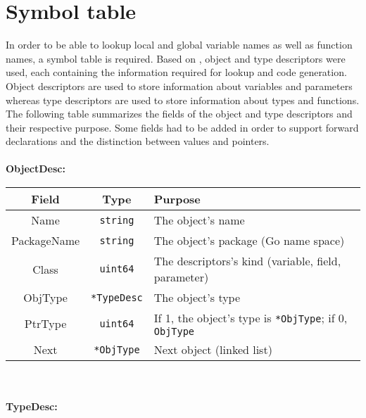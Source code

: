 \documentclass[a4paper]{scrreprt}
\begin{document}
  \chapter{Symbol table}
    In order to be able to lookup local and global variable names as well as function names, a symbol table is required. Based on \cite{wir96}, object and type descriptors were used, each containing the information required for lookup and code generation. Object descriptors are used to store information about variables and parameters whereas type descriptors are used to store information about types and functions.\\
    The following table summarizes the fields of the object and type descriptors and their respective purpose. Some fields had to be added in order to support forward declarations and the distinction between values and pointers.\\ \\
      \textbf{ObjectDesc:}\\
      \begin{tabular}{|c|c|l|}
        \hline
        \textbf{Field} & \textbf{Type} & \textbf{Purpose}\\ \hline
        Name & \texttt{string} & The object's name\\ \hline
        PackageName & \texttt{string} & The object's package (Go name space)\\ \hline
        Class & \texttt{uint64} & The descriptors's kind (variable, field, parameter)\\ \hline
        ObjType & \texttt{*TypeDesc} & The object's type\\ \hline
        PtrType & \texttt{uint64} & If 1, the object's type is \texttt{*ObjType}; if 0, \texttt{ObjType}\\ \hline
        Next & \texttt{*ObjType} & Next object (linked list)\\ \hline
      \end{tabular}\\ \\
      \textbf{TypeDesc:}\\
\end{document}
